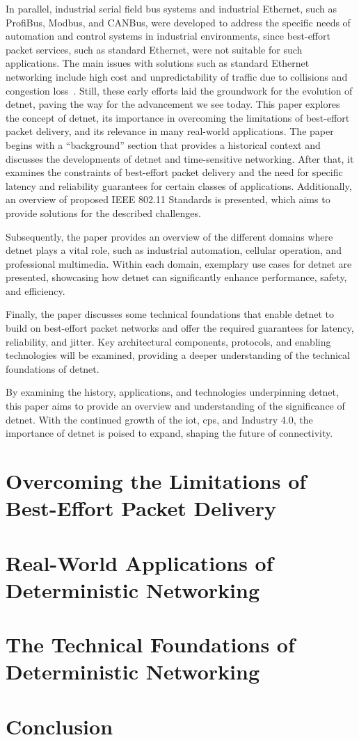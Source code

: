 \documentclass[runningheads]{llncs}
\begin{document}
In parallel, industrial serial field bus systems and industrial Ethernet, such as ProfiBus, Modbus, and CANBus, were developed to address the specific needs of automation and control systems in industrial environments, since best-effort packet services, such as standard Ethernet, were not suitable for such applications. The main issues with solutions such as standard Ethernet networking include high cost and unpredictability of traffic due to collisions and congestion loss~\cite{Finn2018}. Still, these early efforts laid the groundwork for the evolution of \gls{detnet}, paving the way for the advancement we see today. This paper explores the concept of \gls{detnet}, its importance in overcoming the limitations of best-effort packet delivery, and its relevance in many real-world applications. The paper begins with a ``background'' section that provides a historical context and discusses the developments of \gls{detnet} and time-sensitive networking. After that, it examines the constraints of best-effort packet delivery and the need for specific latency and reliability guarantees for certain classes of applications. Additionally, an overview of proposed IEEE 802.11 Standards is presented, which aims to provide solutions for the described challenges.

Subsequently, the paper provides an overview of the different domains where \gls{detnet} plays a vital role, such as industrial automation, cellular operation, and professional multimedia. Within each domain, exemplary use cases for \gls{detnet} are presented, showcasing how \gls{detnet} can significantly enhance performance, safety, and efficiency.

Finally, the paper discusses some technical foundations that enable \gls{detnet} to build on best-effort packet networks and offer the required guarantees for latency, reliability, and jitter. Key architectural components, protocols, and enabling technologies will be examined, providing a deeper understanding of the technical foundations of \gls{detnet}.

By examining the history, applications, and technologies underpinning \gls{detnet}, this paper aims to provide an overview and understanding of the significance of \gls{detnet}. With the continued growth of the \gls{iot}, \gls{cps}, and Industry 4.0, the importance of \gls{detnet} is poised to expand, shaping the future of connectivity.

\section{Overcoming the Limitations of Best-Effort Packet Delivery}
\section{Real-World Applications of Deterministic Networking}
\section{The Technical Foundations of Deterministic Networking}
\section{Conclusion}

\printnoidxglossary[type=acronym,sort=letter,title=Abbreviations]



\end{document}

